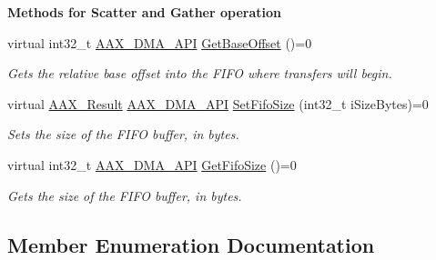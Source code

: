 \begin{Indent}{\bf Methods for Scatter and Gather operation}
\begin{DoxyCompactItemize}
virtual int32\+\_\+t \hyperlink{a00243_acae60d01e5e4bd3282369d0d9d378f3f}{A\+A\+X\+\_\+\+D\+M\+A\+\_\+\+A\+P\+I} \hyperlink{a00095_a1f6ce2d66bb6c26fa4e7e70821e8bd2d}{Get\+Base\+Offset} ()=0
\begin{DoxyCompactList}\small\item\em Gets the relative base offset into the F\+I\+F\+O where transfers will begin. \end{DoxyCompactList}\item 
virtual \hyperlink{a00149_a4d8f69a697df7f70c3a8e9b8ee130d2f}{A\+A\+X\+\_\+\+Result} \hyperlink{a00243_acae60d01e5e4bd3282369d0d9d378f3f}{A\+A\+X\+\_\+\+D\+M\+A\+\_\+\+A\+P\+I} \hyperlink{a00095_a98f731e4c7c60a3b6b969fd699448224}{Set\+Fifo\+Size} (int32\+\_\+t i\+Size\+Bytes)=0
\begin{DoxyCompactList}\small\item\em Sets the size of the F\+I\+F\+O buffer, in bytes. \end{DoxyCompactList}\item 
virtual int32\+\_\+t \hyperlink{a00243_acae60d01e5e4bd3282369d0d9d378f3f}{A\+A\+X\+\_\+\+D\+M\+A\+\_\+\+A\+P\+I} \hyperlink{a00095_aae573c01b6ecc918978f74881e87a761}{Get\+Fifo\+Size} ()=0
\begin{DoxyCompactList}\small\item\em Gets the size of the F\+I\+F\+O buffer, in bytes. \end{DoxyCompactList}\end{DoxyCompactItemize}
\end{Indent}


\subsection{Member Enumeration Documentation}
\hypertarget{a00095_a64e694fd40d32179e429eb7934a64842}{}
